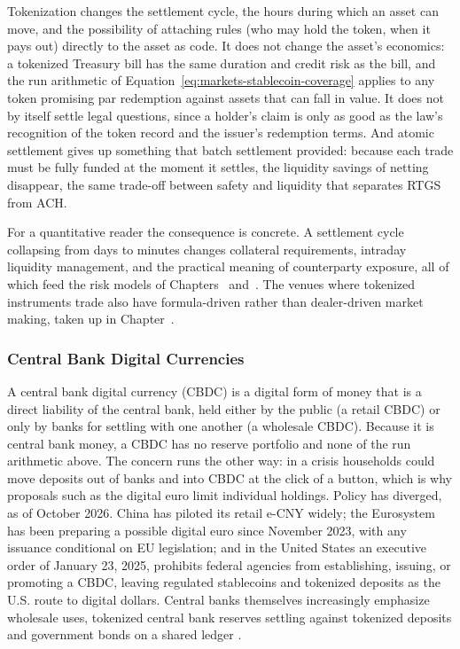 \documentclass[../ai_in_finance]{subfiles}
\begin{document}
Tokenization changes the settlement cycle, the hours during which an asset can move, and the possibility of attaching rules (who may hold the token, when it pays out) directly to the asset as code. It does not change the asset's economics: a tokenized Treasury bill has the same duration and credit risk as the bill, and the run arithmetic of Equation~\eqref{eq:markets-stablecoin-coverage} applies to any token promising par redemption against assets that can fall in value. It does not by itself settle legal questions, since a holder's claim is only as good as the law's recognition of the token record and the issuer's redemption terms. And atomic settlement gives up something that batch settlement provided: because each trade must be fully funded at the moment it settles, the liquidity savings of netting disappear, the same trade-off between safety and liquidity that separates RTGS from ACH.

For a quantitative reader the consequence is concrete. A settlement cycle collapsing from days to minutes changes collateral requirements, intraday liquidity management, and the practical meaning of counterparty exposure, all of which feed the risk models of Chapters~ and~. The venues where tokenized instruments trade also have formula-driven rather than dealer-driven market making, taken up in Chapter~.

\subsubsection*{Central Bank Digital Currencies}

A central bank digital currency (CBDC) is a digital form of money that is a direct liability of the central bank, held either by the public (a retail CBDC) or only by banks for settling with one another (a wholesale CBDC). Because it is central bank money, a CBDC has no reserve portfolio and none of the run arithmetic above. The concern runs the other way: in a crisis households could move deposits out of banks and into CBDC at the click of a button, which is why proposals such as the digital euro limit individual holdings. Policy has diverged, as of October 2026. China has piloted its retail e-CNY widely; the Eurosystem has been preparing a possible digital euro since November 2023, with any issuance conditional on EU legislation; and in the United States an executive order of January 23, 2025, prohibits federal agencies from establishing, issuing, or promoting a CBDC, leaving regulated stablecoins and tokenized deposits as the U.S. route to digital dollars. Central banks themselves increasingly emphasize wholesale uses, tokenized central bank reserves settling against tokenized deposits and government bonds on a shared ledger \parencite{bis2025nextgen}.
\end{document}
